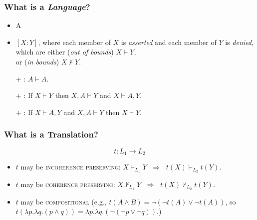 \documentclass{beamer} %
\begin{document}
\begin{frame}\frametitle{What is a \emph{Language}?}\Large \pause
\begin{itemize}
\item A \textsc{} \pause
\item \textsc{} $[X:Y]$, where each member of $X$ is \emph{asserted} and each member of $Y$ is \emph{denied}, \\[4mm] \pause which are either \textsc{} (\emph{out of bounds}) $X\vdash Y$,\\ \pause or \textsc{} (\emph{in bounds}) $X\not\vdash Y$.\\[7mm]\pause
\item[+] \textsc{:} $A\vdash A$. \pause
\item[+] \textsc{:} If $X\vdash Y$ then $X,A\vdash Y$ and $X\vdash A,Y$.\pause
\item[+] \textsc{:} If $X\vdash A,Y$ and $X,A\vdash Y$ then $X\vdash Y$.
\end{itemize}
\end{frame}

\begin{frame}\frametitle{What is a Translation?}\LARGE\pause
\[
t:L_1\to L_2
\]\large\pause
\begin{itemize}
\item $t$ may be \textsc{incoherence preserving}: $X\vdash_{L_1} Y$ $\;\Rightarrow\;$ $t(X)\vdash_{L_2} t(Y)$.\\[3mm]\pause
\item $t$ may be \textsc{coherence preserving}: $X\not\vdash_{L_1} Y$ $\;\Rightarrow\;$ $t(X)\not\vdash_{L_2} t(Y)$.\\[3mm]\pause
\item $t$ may be \textsc{compositional} (e.g., $t(A\land B)=\neg(\neg t(A)\lor\neg t(A))$, so $t(\lambda p.\lambda q.(p\land q))=\lambda p.\lambda q.(\neg(\neg p\lor\neg q))$.)
\end{itemize}

\end{frame}
\end{document}
